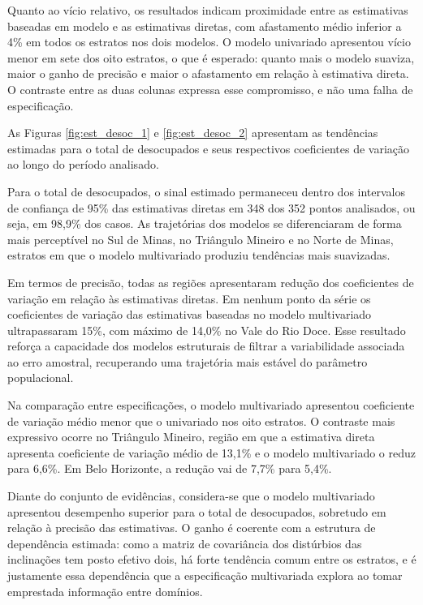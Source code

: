 \documentclass[rbe,wwwview]{econbr}
\begin{document}
Quanto ao vício relativo, os resultados indicam proximidade entre as estimativas baseadas em modelo e as estimativas diretas, com afastamento médio inferior a 4\% em todos os estratos nos dois modelos. O modelo univariado apresentou vício menor em sete dos oito estratos, o que é esperado: quanto mais o modelo suaviza, maior o ganho de precisão e maior o afastamento em relação à estimativa direta. O contraste entre as duas colunas expressa esse compromisso, e não uma falha de especificação.

As Figuras \ref{fig:est_desoc_1} e \ref{fig:est_desoc_2} apresentam as tendências estimadas para o total de desocupados e seus respectivos coeficientes de variação ao longo do período analisado.

Para o total de desocupados, o sinal estimado permaneceu dentro dos intervalos de confiança de 95\% das estimativas diretas em 348 dos 352 pontos analisados, ou seja, em 98,9\% dos casos. As trajetórias dos modelos se diferenciaram de forma mais perceptível no Sul de Minas, no Triângulo Mineiro e no Norte de Minas, estratos em que o modelo multivariado produziu tendências mais suavizadas.

Em termos de precisão, todas as regiões apresentaram redução dos coeficientes de variação em relação às estimativas diretas. Em nenhum ponto da série os coeficientes de variação das estimativas baseadas no modelo multivariado ultrapassaram 15\%, com máximo de 14,0\% no Vale do Rio Doce. Esse resultado reforça a capacidade dos modelos estruturais de filtrar a variabilidade associada ao erro amostral, recuperando uma trajetória mais estável do parâmetro populacional.

Na comparação entre especificações, o modelo multivariado apresentou coeficiente de variação médio menor que o univariado nos oito estratos. O contraste mais expressivo ocorre no Triângulo Mineiro, região em que a estimativa direta apresenta coeficiente de variação médio de 13,1\% e o modelo multivariado o reduz para 6,6\%. Em Belo Horizonte, a redução vai de 7,7\% para 5,4\%.

Diante do conjunto de evidências, considera-se que o modelo multivariado apresentou desempenho superior para o total de desocupados, sobretudo em relação à precisão das estimativas. O ganho é coerente com a estrutura de dependência estimada: como a matriz de covariância dos distúrbios das inclinações tem posto efetivo dois, há forte tendência comum entre os estratos, e é justamente essa dependência que a especificação multivariada explora ao tomar emprestada informação entre domínios.
\end{document}
